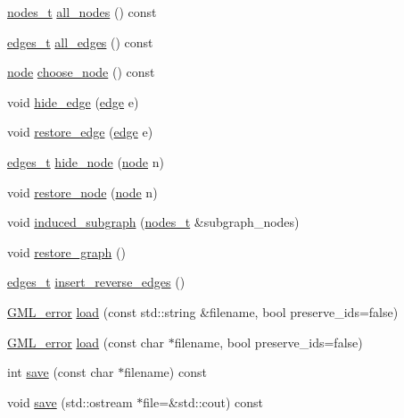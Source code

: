 \begin{DoxyCompactItemize}
\mbox{\hyperlink{edge_8h_a22ac17689106ba21a84e7bc54d1199d6}{nodes\+\_\+t}} \mbox{\hyperlink{classgraph_a268af566b8df2cbaede1319ad370dc7e}{all\+\_\+nodes}} () const
\item 
\mbox{\hyperlink{edge_8h_a8f9587479bda6cf612c103494b3858e3}{edges\+\_\+t}} \mbox{\hyperlink{classgraph_aa0c7027e0cc7430b77ab9629eecefd3f}{all\+\_\+edges}} () const
\item 
\mbox{\hyperlink{classnode}{node}} \mbox{\hyperlink{classgraph_aec5c11c90a94ebd145f059a541db860e}{choose\+\_\+node}} () const
\item 
void \mbox{\hyperlink{classgraph_ab2f8520bcac080d73c55228fecc61825}{hide\+\_\+edge}} (\mbox{\hyperlink{classedge}{edge}} e)
\item 
void \mbox{\hyperlink{classgraph_a2e5426682a0897b9f9104b019970bedc}{restore\+\_\+edge}} (\mbox{\hyperlink{classedge}{edge}} e)
\item 
\mbox{\hyperlink{edge_8h_a8f9587479bda6cf612c103494b3858e3}{edges\+\_\+t}} \mbox{\hyperlink{classgraph_a214618b5e3c02695779350532506e225}{hide\+\_\+node}} (\mbox{\hyperlink{classnode}{node}} n)
\item 
void \mbox{\hyperlink{classgraph_ab57aab79e649cc275052b7decbdd03ec}{restore\+\_\+node}} (\mbox{\hyperlink{classnode}{node}} n)
\item 
void \mbox{\hyperlink{classgraph_a15b766094bb0b97ef53e06e7c26b2197}{induced\+\_\+subgraph}} (\mbox{\hyperlink{edge_8h_a22ac17689106ba21a84e7bc54d1199d6}{nodes\+\_\+t}} \&subgraph\+\_\+nodes)
\item 
void \mbox{\hyperlink{classgraph_a53e2a5505fa6427587e12d66e4a86cec}{restore\+\_\+graph}} ()
\item 
\mbox{\hyperlink{edge_8h_a8f9587479bda6cf612c103494b3858e3}{edges\+\_\+t}} \mbox{\hyperlink{classgraph_a1085478258cf370dcfbe283e834df339}{insert\+\_\+reverse\+\_\+edges}} ()
\item 
\mbox{\hyperlink{struct_g_m_l__error}{G\+M\+L\+\_\+error}} \mbox{\hyperlink{classgraph_ac28cb3468623a480709d3329033d4ec8}{load}} (const std\+::string \&filename, bool preserve\+\_\+ids=false)
\item 
\mbox{\hyperlink{struct_g_m_l__error}{G\+M\+L\+\_\+error}} \mbox{\hyperlink{classgraph_a37c17685e1becc66723699d4c9db072b}{load}} (const char $\ast$filename, bool preserve\+\_\+ids=false)
\item 
int \mbox{\hyperlink{classgraph_a7bd0712a528249d1585085a64ac3e661}{save}} (const char $\ast$filename) const
\item 
void \mbox{\hyperlink{classgraph_ad53bd0f3c96616b7f2d44abdce3df6de}{save}} (std\+::ostream $\ast$file=\&std\+::cout) const

\end{DoxyCompactItemize}
